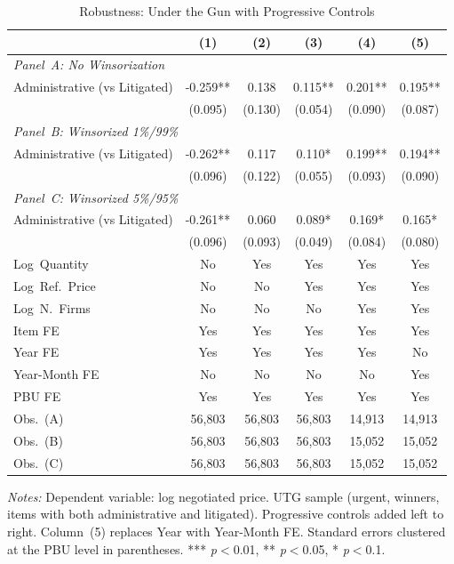 \begin{table}[ht]
  \centering
  \caption{Robustness: Under the Gun with Progressive Controls}
  \label{tab:rob_utg}
  \small
  \begin{threeparttable}
  \begin{tabular}{lccccc}
    \hline\hline
    & (1) & (2) & (3) & (4) & (5) \\
    \hline
    \multicolumn{6}{l}{\textit{Panel~A: No Winsorization}} \\[3pt]
    Administrative (vs Litigated) & -0.259** & 0.138 & 0.115** & 0.201** & 0.195** \\
     & (0.095) & (0.130) & (0.054) & (0.090) & (0.087) \\[3pt]
    \hline
    \multicolumn{6}{l}{\textit{Panel~B: Winsorized 1\%/99\%}} \\[3pt]
    Administrative (vs Litigated) & -0.262** & 0.117 & 0.110* & 0.199** & 0.194** \\
     & (0.096) & (0.122) & (0.055) & (0.093) & (0.090) \\[3pt]
    \hline
    \multicolumn{6}{l}{\textit{Panel~C: Winsorized 5\%/95\%}} \\[3pt]
    Administrative (vs Litigated) & -0.261** & 0.060 & 0.089* & 0.169* & 0.165* \\
     & (0.096) & (0.093) & (0.049) & (0.084) & (0.080) \\[3pt]
    \hline
    Log~Quantity & No & Yes & Yes & Yes & Yes \\
    Log~Ref.~Price & No & No & Yes & Yes & Yes \\
    Log~N.~Firms & No & No & No & Yes & Yes \\
    Item FE & Yes & Yes & Yes & Yes & Yes \\
    Year FE & Yes & Yes & Yes & Yes & No \\
    Year-Month FE & No & No & No & No & Yes \\
    PBU FE & Yes & Yes & Yes & Yes & Yes \\
    Obs.\ (A) & 56,803 & 56,803 & 56,803 & 14,913 & 14,913 \\
    Obs.\ (B) & 56,803 & 56,803 & 56,803 & 15,052 & 15,052 \\
    Obs.\ (C) & 56,803 & 56,803 & 56,803 & 15,052 & 15,052 \\
    \hline\hline
  \end{tabular}
  \begin{tablenotes}
    \small
    \item \textit{Notes:} Dependent variable: log negotiated price. UTG sample (urgent, winners, items with both administrative and litigated). Progressive controls added left to right. Column~(5) replaces Year with Year-Month FE. Standard errors clustered at the PBU level in parentheses. *** \textit{p}$<$0.01, ** \textit{p}$<$0.05, * \textit{p}$<$0.1.
  \end{tablenotes}
  \end{threeparttable}
\end{table}
